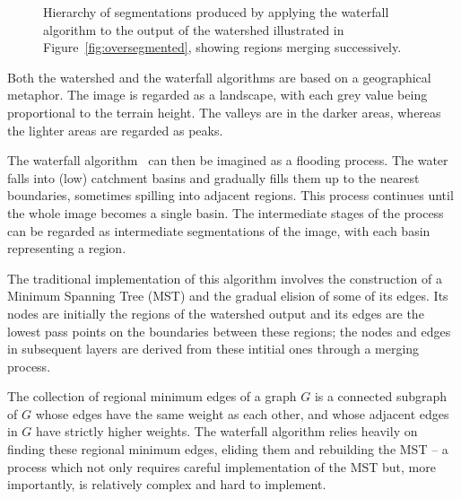 \documentclass{ouclprgsc}
\begin{document}
\begin{figure}
\centering
\ifpdf
        \hspace{1mm}%
        \hspace{1mm}%
\else
\fi
\caption{Hierarchy of segmentations produced by applying the waterfall
  algorithm to the output of the watershed illustrated in
  Figure~\ref{fig:oversegmented}, showing regions merging
  successively.}
\label{fig:waterfall}
\end{figure}


Both the watershed and the waterfall algorithms are based on a
geographical metaphor. The image is regarded as a landscape, with each
grey value being proportional to the terrain height. 
%
The valleys are
in the darker areas, whereas the lighter areas are regarded as peaks.

The waterfall algorithm~\cite{beucher94,marcotegui} can then be imagined
as a flooding process. The water falls into (low) catchment basins and
gradually fills them up to the nearest boundaries, sometimes spilling
into adjacent regions. This process continues until the whole image
becomes a single basin. The intermediate stages of the process can be
regarded as intermediate segmentations of the image, with each basin
representing a region.

The traditional implementation of this algorithm \cite{marcotegui}
involves the construction of a Minimum Spanning Tree (MST) and the
gradual elision of some of its edges. 
Its nodes are initially the regions of the watershed output and its
edges are the lowest pass points on the boundaries between these
regions; the nodes and edges in subsequent layers are derived from
these intitial ones through a merging process.

The collection of regional minimum edges of a graph $G$ is a connected
subgraph of $G$ whose edges have the same weight as each other, and
whose adjacent edges in $G$ have strictly higher weights. The
waterfall algorithm relies heavily on finding these regional minimum
edges, eliding them and rebuilding the MST -- a process which not only
requires careful implementation of the MST but, more importantly, is
relatively complex and hard to implement.
\end{document}
